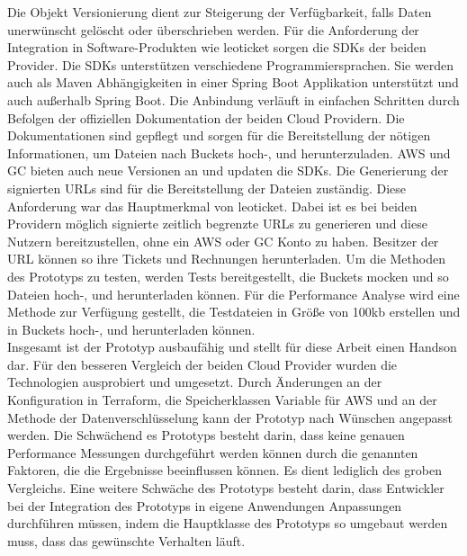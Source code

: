 Die Objekt Versionierung dient zur Steigerung der Verfügbarkeit, falls Daten unerwünscht gelöscht oder überschrieben werden. Für die Anforderung der Integration in Software-Produkten wie leoticket sorgen die SDKs der beiden Provider. Die SDKs unterstützen verschiedene Programmiersprachen. Sie werden auch als Maven Abhängigkeiten in einer Spring Boot Applikation unterstützt und auch außerhalb Spring Boot. Die Anbindung verläuft in einfachen Schritten durch Befolgen der offiziellen Dokumentation der beiden Cloud Providern. Die Dokumentationen sind gepflegt und sorgen für die Bereitstellung der nötigen Informationen, um Dateien nach Buckets hoch-, und herunterzuladen. AWS und GC bieten auch neue Versionen an und updaten die SDKs. Die Generierung der signierten URLs sind für die Bereitstellung der Dateien zuständig. Diese Anforderung war das Hauptmerkmal von leoticket. Dabei ist es bei beiden Providern möglich signierte zeitlich begrenzte URLs zu generieren und diese Nutzern bereitzustellen, ohne ein AWS oder GC Konto zu haben. Besitzer der URL können so ihre Tickets und Rechnungen herunterladen. Um die Methoden des Prototyps zu testen, werden Tests bereitgestellt, die Buckets mocken und so Dateien hoch-, und herunterladen können. Für die Performance Analyse wird eine Methode zur Verfügung gestellt, die Testdateien in Größe von 100kb erstellen und in Buckets hoch-, und herunterladen können.\\

Insgesamt ist der Prototyp ausbaufähig und stellt für diese Arbeit einen Handson dar. Für den besseren Vergleich der beiden Cloud Provider wurden die Technologien ausprobiert und umgesetzt. Durch Änderungen an der Konfiguration in Terraform, die Speicherklassen Variable für AWS und an der Methode der Datenverschlüsselung kann der Prototyp nach Wünschen angepasst werden. Die Schwächend es Prototyps besteht darin, dass keine genauen Performance Messungen durchgeführt werden können durch die genannten Faktoren, die die Ergebnisse beeinflussen können. Es dient lediglich des groben Vergleichs. Eine weitere Schwäche des Prototyps besteht darin, dass Entwickler bei der Integration des Prototyps in eigene Anwendungen Anpassungen durchführen müssen, indem die Hauptklasse des Prototyps so umgebaut werden muss, dass das gewünschte Verhalten läuft.
